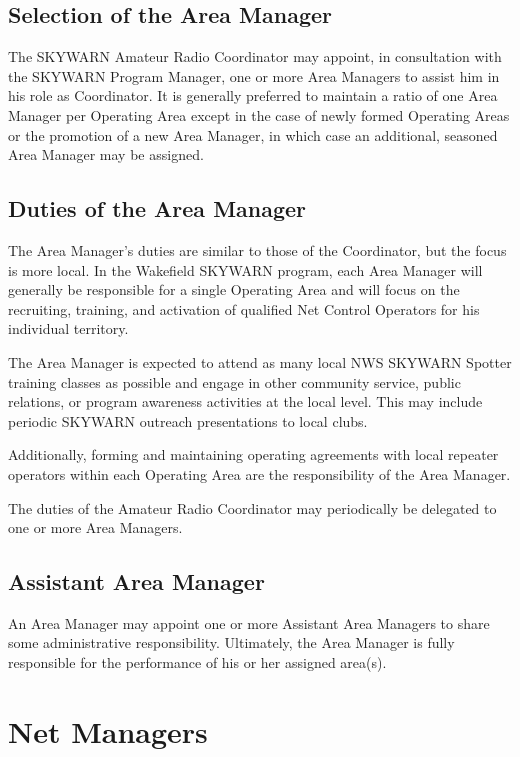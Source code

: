 \documentclass[pdflatex,letterpaper,twoside,12pt]{book}
\begin{document}
\subsection{Selection of the Area Manager}

The SKYWARN Amateur Radio Coordinator may appoint, in consultation with the SKYWARN Program Manager, one or more Area Managers to assist him in his role as Coordinator.  It is generally preferred to maintain a ratio of one Area Manager per Operating Area except in the case of newly formed Operating Areas or the promotion of a new Area Manager, in which case an additional, seasoned Area Manager may be assigned. 

\subsection{Duties of the Area Manager}

The Area Manager's duties are similar to those of the Coordinator, but the focus is more local.  In the Wakefield SKYWARN program, each Area Manager will generally be responsible for a single Operating Area and will focus on the recruiting, training, and activation of qualified Net Control Operators for his individual territory. 

The Area Manager is expected to attend as many local NWS SKYWARN Spotter training classes as possible and engage in other community service, public relations, or program awareness activities at the local level.  This may include periodic SKYWARN outreach presentations to local clubs.

Additionally, forming and maintaining operating agreements with local repeater operators within each Operating Area are the responsibility of the Area Manager.

The duties of the Amateur Radio Coordinator may periodically be delegated to one or more Area Managers.

\subsection{Assistant Area Manager}

An Area Manager may appoint one or more Assistant Area Managers to share some administrative responsibility.  Ultimately, the Area Manager is fully responsible for the performance of his or her assigned area(s).


\section{Net Managers}\label{net-manager}
\end{document}
